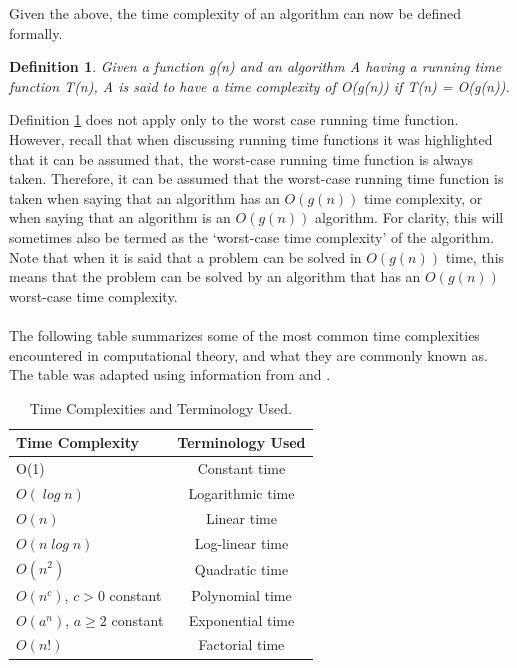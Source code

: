 \documentclass[12pt]{article}
\newtheorem{definition}{Definition}[subsection]
\numberwithin{equation}{subsection}
\numberwithin{table}{subsection}
\numberwithin{algorithm}{subsection}
\numberwithin{figure}{subsection}
\begin{document}
Given the above, the time complexity of an algorithm can now be defined formally.
\begin{definition}
\label{time_complexity}
Given a function g(n) and an algorithm A having a running time function T(n), A is said to have a time complexity of O(g(n)) if T(n) = O(g(n)).  
\end{definition}
Definition \ref{time_complexity} does not apply only to the worst case running time function. However, recall that when discussing running time functions it was highlighted that it can be assumed that, the worst-case running time function is always taken. Therefore, it can be assumed that the worst-case running time function is taken when saying that an algorithm has an $\mathit{O(g(n))}$ time complexity, or when saying that an algorithm is an $\mathit{O(g(n))}$ algorithm. For clarity, this will sometimes also be termed as the `worst-case time complexity' of the algorithm. Note that when it is said that a problem can be solved in $\mathit{O(g(n))}$ time, this means that the problem can be solved by an algorithm that has an $\mathit{O(g(n))}$ worst-case time complexity.\\\\
The following table summarizes some of the most common time complexities encountered in computational theory, and what they are commonly known as. The table was adapted using information from \cite{pettis} and \cite{carter_1999}.
\begin{table}[!htbp]
  \begin{center}
    \caption{Time Complexities and Terminology Used.}
    \label{tab:table1}
    \begin{tabular}{l|c} %
      \textbf{Time Complexity} & \textbf{Terminology Used}\\
      \hline
      O(1)                          & Constant time    \\
     $O(\mathit{\log n})$          & Logarithmic time \\
     $O(\mathit{n})$               & Linear time      \\
     $O(\mathit{n \log n})$        & Log-linear time  \\
     $O(\mathit{n^2})$             & Quadratic time   \\
     $O(\mathit{n^c})$, $\mathit{c > 0}$ constant & Polynomial time  \\
     $O(\mathit{a^n})$, $\mathit{a \geq 2}$ constant & Exponential time \\
     $O(\mathit{n!})$              & Factorial time
    \end{tabular}
  \end{center}
\end{table}
\end{document}
